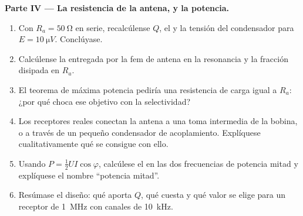\begin{problem}
\medskip
\noindent\textbf{Parte IV --- La resistencia de la antena, y la potencia.}
\begin{enumerate}[resume]
  \item Con $R_a = \qty{50}{\ohm}$ en serie, recalcúlense $Q$, el  y la tensión del condensador para $E = \qty{10}{\micro V}$.
        Conclúyase.
  \item Calcúlense la  entregada por la fem de antena en la
        resonancia y la fracción disipada en $R_a$.
  \item El teorema de máxima potencia pediría una resistencia de carga
        igual a $R_a$: ¿por qué choca ese objetivo con la selectividad?
  \item Los receptores reales conectan la antena a una toma intermedia de
        la bobina, o a través de un pequeño condensador de acoplamiento.
        Explíquese cualitativamente qué se consigue con ello.
  \item Usando $P = \tfrac12 UI\cos\varphi$, calcúlese el  en las dos frecuencias de potencia mitad y explíquese el
        nombre ``potencia mitad''.
  \item Resúmase el diseño: qué aporta $Q$, qué cuesta y qué valor se
        elige para un receptor de \qty{1}{MHz} con canales de
        \qty{10}{kHz}.
\end{enumerate}
\end{problem}
